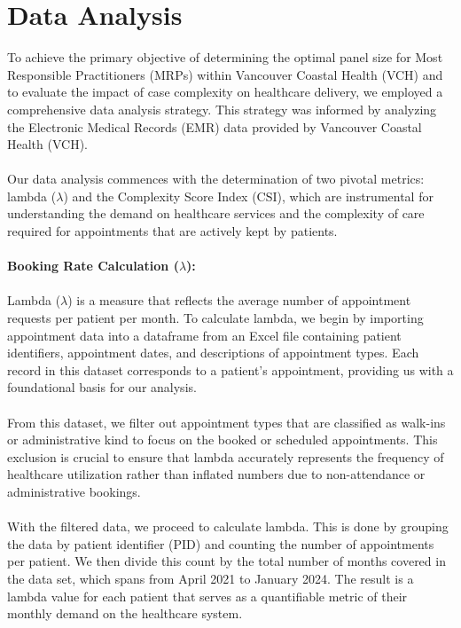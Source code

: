 \documentclass[11pt]{article}
\theoremstyle{definition}
\begin{document}
\section{Data Analysis}

To achieve the primary objective of determining the optimal panel size for Most Responsible Practitioners (MRPs) within Vancouver Coastal Health (VCH) and to evaluate the impact of case complexity on healthcare delivery, we employed a comprehensive data analysis strategy. This strategy was informed by analyzing the Electronic Medical Records (EMR) data provided by Vancouver Coastal Health (VCH).\\\\
Our data analysis commences with the determination of two pivotal metrics: lambda ($\lambda$) and the Complexity Score Index (CSI), which are instrumental for understanding the demand on healthcare services and the complexity of care required for appointments that are actively kept by patients.\\\\
\textbf{Booking Rate Calculation ($\lambda$):}\\\\
Lambda ($\lambda$) is a measure that reflects the average number of appointment requests per patient per month. To calculate lambda, we begin by importing appointment data into a dataframe from an Excel file containing patient identifiers, appointment dates, and descriptions of appointment types. Each record in this dataset corresponds to a patient's appointment, providing us with a foundational basis for our analysis.\\\\
From this dataset, we filter out appointment types that are classified as walk-ins or administrative kind to focus on the booked or scheduled appointments. This exclusion is crucial to ensure that lambda accurately represents the frequency of healthcare utilization rather than inflated numbers due to non-attendance or administrative bookings.\\\\
With the filtered data, we proceed to calculate lambda. This is done by grouping the data by patient identifier (PID) and counting the number of appointments per patient. We then divide this count by the total number of months covered in the data set, which spans from April 2021 to January 2024. The result is a lambda value for each patient that serves as a quantifiable metric of their monthly demand on the healthcare system.\\\\
\end{document}
